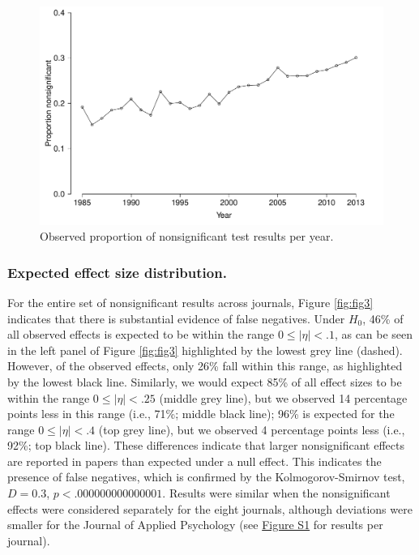 \documentclass{article}
\begin{document}
\begin{figure}
\begin{center}
\includegraphics{../figures/Fig2.pdf}
\end{center}
\caption{Observed proportion of nonsignificant test results per year.}
\label{fig:fig2}
\end{figure}

\subsubsection*{Expected effect size distribution.}


For the entire set of nonsignificant results across journals, Figure \ref{fig:fig3} indicates that there is substantial evidence of false negatives. Under $H_0$, 46\% of all observed effects is expected to be within the range $0\leq|\eta|<.1$, as can be seen in the left panel of Figure \ref{fig:fig3} highlighted by the lowest grey line (dashed). However, of the observed effects, only 26\% fall within this range, as highlighted by the lowest black line. Similarly, we would expect 85\% of all effect sizes to be within the range $0\leq|\eta|<.25$ (middle grey line), but we observed 14 percentage points less in this range (i.e., 71\%; middle black line); 96\% is expected for the range $0\leq|\eta|<.4$ (top grey line), but we observed 4 percentage points less (i.e., 92\%; top black line). These differences indicate that larger nonsignificant effects are reported in papers than expected under a null effect. This indicates the presence of false negatives, which is confirmed by the Kolmogorov-Smirnov test, $D=0.3$, $p<.000000000000001$. Results were similar when the nonsignificant effects were considered separately for the eight journals, although deviations were smaller for the Journal of Applied Psychology (see \href{../figures/S1Fig}{Figure S1} for results per journal).
\end{document}
